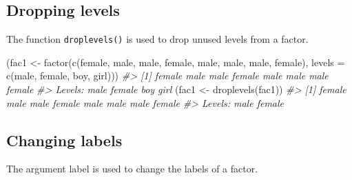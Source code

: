 \documentclass[
]{book}
\newenvironment{Shaded}{\begin{snugshade}}{\end{snugshade}}
\newcommand{\AttributeTok}[1]{\textcolor[rgb]{0.77,0.63,0.00}{#1}}
\newcommand{\CommentTok}[1]{\textcolor[rgb]{0.56,0.35,0.01}{\textit{#1}}}
\newcommand{\FunctionTok}[1]{\textcolor[rgb]{0.00,0.00,0.00}{#1}}
\newcommand{\NormalTok}[1]{#1}
\newcommand{\OtherTok}[1]{\textcolor[rgb]{0.56,0.35,0.01}{#1}}
\newcommand{\StringTok}[1]{\textcolor[rgb]{0.31,0.60,0.02}{#1}}
\begin{document}
\hypertarget{dropping-levels}{%
\subsection{Dropping levels}\label{dropping-levels}}

The function \texttt{droplevels()} is used to drop unused levels from a factor.

\begin{Shaded}
\begin{Highlighting}[]
\NormalTok{(fac1 }\OtherTok{\textless{}{-}} \FunctionTok{factor}\NormalTok{(}\FunctionTok{c}\NormalTok{(}\StringTok{\textquotesingle{}female\textquotesingle{}}\NormalTok{, }\StringTok{\textquotesingle{}male\textquotesingle{}}\NormalTok{, }\StringTok{\textquotesingle{}male\textquotesingle{}}\NormalTok{, }\StringTok{\textquotesingle{}female\textquotesingle{}}\NormalTok{, }\StringTok{\textquotesingle{}male\textquotesingle{}}\NormalTok{, }\StringTok{\textquotesingle{}male\textquotesingle{}}\NormalTok{, }\StringTok{\textquotesingle{}male\textquotesingle{}}\NormalTok{, }\StringTok{\textquotesingle{}female\textquotesingle{}}\NormalTok{), }
               \AttributeTok{levels =} \FunctionTok{c}\NormalTok{(}\StringTok{\textquotesingle{}male\textquotesingle{}}\NormalTok{, }\StringTok{\textquotesingle{}female\textquotesingle{}}\NormalTok{, }\StringTok{\textquotesingle{}boy\textquotesingle{}}\NormalTok{, }\StringTok{\textquotesingle{}girl\textquotesingle{}}\NormalTok{)))}
\CommentTok{\#\textgreater{} [1] female male   male   female male   male   male   female}
\CommentTok{\#\textgreater{} Levels: male female boy girl}
\NormalTok{(fac1 }\OtherTok{\textless{}{-}} \FunctionTok{droplevels}\NormalTok{(fac1))}
\CommentTok{\#\textgreater{} [1] female male   male   female male   male   male   female}
\CommentTok{\#\textgreater{} Levels: male female}
\end{Highlighting}
\end{Shaded}

\hypertarget{changing-labels}{%
\subsection{Changing labels}\label{changing-labels}}

The argument label is used to change the labels of a factor.
\end{document}
